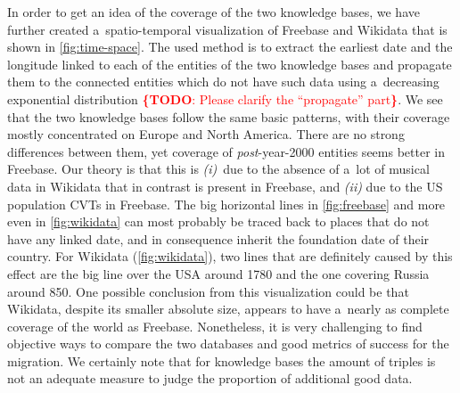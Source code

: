 \documentclass{sig-alternate}
\newcommand{\todo}[1]{\noindent\textcolor{red}{{\bf \{TODO}: #1{\bf \}}}}
\begin{document}
In order to get an idea of the coverage of the two knowledge bases,
we have further created a~spatio-temporal visualization of Freebase and Wikidata 
that is shown in \autoref{fig:time-space}.
The used method is to extract the earliest date and the longitude
linked to each of the entities of the two knowledge bases
and propagate them to the connected entities which do not have such data
using a~decreasing exponential distribution \todo{Please clarify the ``propagate'' part}.
We see that the two knowledge bases follow the same basic patterns,
with their coverage mostly concentrated on Europe and North America.
There are no strong differences between them,
yet coverage of \mbox{\emph{post}-year-2000} entities seems better in Freebase.
Our theory is that this is \emph{(i)}~due to the absence of a~lot of musical data in Wikidata
that in contrast is present in Freebase,
and \emph{(ii)} due to the US population CVTs in Freebase.
The big horizontal lines in \autoref{fig:freebase} and more even in \autoref{fig:wikidata}
can most probably be traced back to places that do not have any linked date,
and in consequence inherit the foundation date of their country.
For Wikidata (\autoref{fig:wikidata}), two lines that are definitely caused by this effect
are the big line over the USA around 1780
and the one covering Russia around 850.
One possible conclusion from this visualization could be that Wikidata,
despite its smaller absolute size, appears to have
a~nearly as complete coverage of the world as Freebase.
Nonetheless, it is very challenging to find objective ways to compare the two databases
and good metrics of success for the migration.
We certainly note that for knowledge bases the amount of triples is not an adequate measure
to judge the proportion of additional good data.
\end{document}
